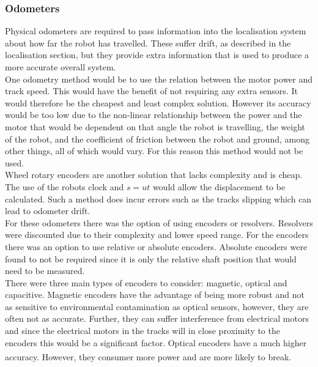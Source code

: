 \documentclass[11pt]{article}		%
\newcommand{\supercite}[1]{\textsuperscript{\cite{#1}}}		%
\begin{document}
        \subsubsection{Odometers}
        
	        Physical odometers are required to pass information into the localisation system about how far the robot has travelled.
	        These suffer drift, as described in the localisation section, but they provide extra information that is used to produce a more accurate overall system.
	        \\
	        One odometry method would be to use the relation between the motor power and track speed.
	        This would have the benefit of not requiring any extra sensors. 
	        It would therefore be the cheapest and least complex solution.
	        However its accuracy would be too low due to the non-linear relationship between the power and the motor that would be dependent on that angle the robot is travelling, the weight of the robot, and the coefficient of friction between the robot and ground, among other things, all of which would vary.
	        For this reason this method would not be used.
	        \\
	        Wheel rotary encoders are another solution that lacks complexity and is cheap.
	        The use of the robots clock and $s=ut$ would allow the displacement to be calculated. 
	        Such a method does incur errors such as the tracks slipping which can lead to odometer drift.
	        \\
	        For these odometers there was the option of using encoders or resolvers.
	        Resolvers were discounted due to their complexity and lower speed range.
	        For the encoders there was an option to use relative or absolute encoders. 
	        Absolute encoders were found to not be required since it is only the relative shaft position that would need to be measured.
	        \\
	        There were three main types of encoders to consider: magnetic, optical and capacitive.
	        Magnetic encoders have the advantage of being more robust and not as sensitive to environmental contamination as optical sensors, however, they are often not as accurate. 
	        Further, they can suffer interference from electrical motors and since the electrical motors in the tracks will in close proximity to the encoders this would be a significant factor. 
	        Optical encoders have a much higher accuracy.\supercite{Encoders} 
	        However, they consumer more power and are more likely to break. 
\end{document}
